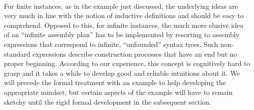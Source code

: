 \begin{example}
{}
\\[-2ex]
\end{example}


%

For finite instances, as in the example just discussed, the underlying ideas are very much in line with the notion of inductive definitions and should be easy to comprehend.
Opposed to this, for infinite instances, the much more elusive idea of an ``infinite assembly plan'' has to be implemented by resorting to assembly expressions that correspond to infinite, ``unfounded'' syntax trees. Such non-standard expressions describe construction processes that have an end but no proper beginning. According to our experience, this concept is cognitively hard to grasp and it takes a while to develop good and reliable intuitions about it. We will precede the formal treatment with an example to help developing the appropriate mindset, but certain aspects of the example will have to remain sketchy until the rigid formal development in the subsequent section.

